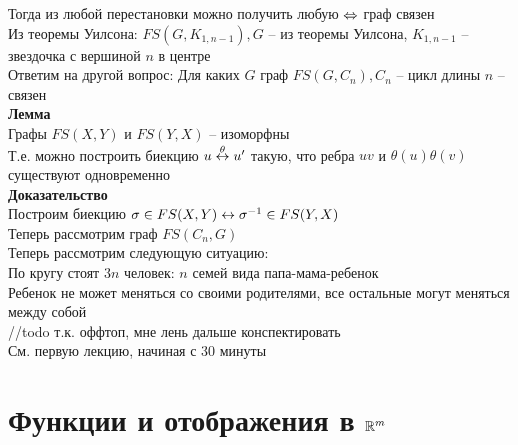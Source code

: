 \documentclass[12pt]{article}
\begin{document}
Тогда из любой перестановки можно получить любую $\Leftrightarrow$ граф связен\\
Из теоремы Уилсона: $FS(G, K_{1, n-1}), G$ -- из теоремы Уилсона, $K_{1,n-1}$ -- звездочка с вершиной $n$ в центре\\
Ответим на другой вопрос: Для каких $G$ граф $FS(G, C_n), C_n$ -- цикл длины $n$ -- связен\\
\textbf{Лемма}\\
Графы $FS(X, Y)$ и $FS(Y,X)$ -- изоморфны\\
Т.е. можно построить биекцию $u \overset{\theta}{\leftrightarrow} u'$ такую, что ребра $uv$ и $\theta(u)\theta(v)$ существуют одновременно\\
\textbf{Доказательство}\\
Построим биекцию $\sigma \in FS(X,Y) \leftrightarrow \sigma^{-1} \in FS(Y, X)$\\
Теперь рассмотрим граф $FS(C_n, G)$\\
Теперь рассмотрим следующую ситуацию:\\
По кругу стоят $3n$ человек: $n$ семей вида папа-мама-ребенок\\
Ребенок не может меняться со своими родителями, все остальные могут меняться между собой\\
//todo т.к. оффтоп, мне лень дальше конспектировать\\
См. первую лекцию, начиная с 30 минуты\\
\section{Функции и отображения в $\mathbb{R}^m$}
\end{document}
